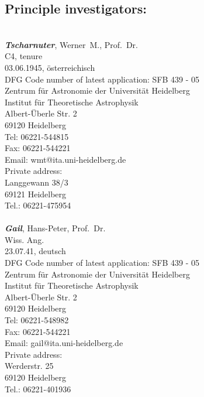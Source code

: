 \subsection{Principle investigators:}
\hspace{-\baselineskip}\\\noindent
%
{\bfseries\itshape Tscharnuter}, Werner~M., Prof.~Dr.\\
C4, tenure\\
03.06.1945, \"osterreichisch\\
DFG Code number of latest application: SFB 439 - 05\\
Zentrum f\"ur Astronomie der Universit\"at Heidelberg\\
Institut f\"ur Theoretische Astrophysik\\
Albert-\"Uberle Str. 2\\
69120 Heidelberg\\
Tel: 06221-544815\\
Fax: 06221-544221\\
Email: wmt@ita.uni-heidelberg.de\\
Private address:\\
Langgewann 38/3\\
69121 Heidelberg\\
Tel.: 06221-475954\\
%
\vspace{1em}\\\noindent
{\bfseries\itshape Gail}, Hans-Peter, Prof.~Dr.\\
Wiss. Ang.\\
23.07.41, deutsch\\
DFG Code number of latest application: SFB 439 - 05\\
Zentrum f\"ur Astronomie der Universit\"at Heidelberg\\
Institut f\"ur Theoretische Astrophysik\\
Albert-\"Uberle Str. 2\\
69120 Heidelberg\\
Tel: 06221-548982\\
Fax: 06221-544221\\
Email: gail@ita.uni-heidelberg.de\\
Private address:\\
Werderstr. 25\\
69120 Heidelberg\\
Tel.: 06221-401936\\
%
\vspace{1em}\\\noindent
